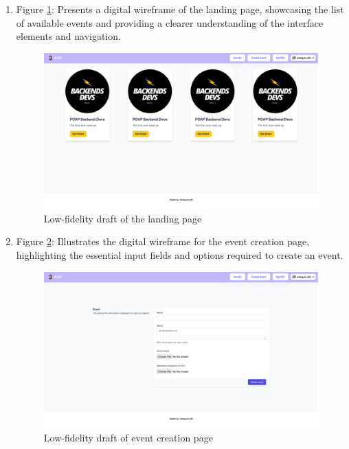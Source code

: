 \begin{enumerate}
\item Figure \ref{Abb7}: Presents a digital wireframe of the landing page, showcasing the list of available events and providing a clearer understanding of the interface elements and navigation. \
\begin{figure}[H]
\centering
\includegraphics[width=1\linewidth]{PICs/LowFiLanding.png}
\caption{Low-fidelity draft of the landing page}\label{Abb7}
\end{figure}

\item Figure \ref{Abb8}: Illustrates the digital wireframe for the event creation page, highlighting the essential input fields and options required to create an event.\\
\begin{figure}[H]
\centering
\includegraphics[width=1\linewidth]{PICs/LowFiCreate.png}
\caption{Low-fidelity draft of event creation page}\label{Abb8}
\end{figure}


\end{enumerate}
